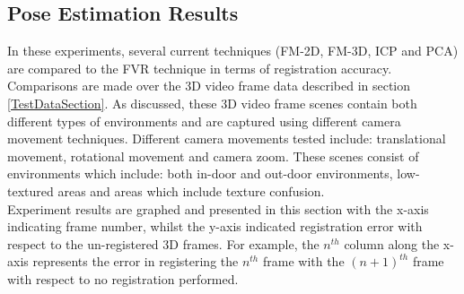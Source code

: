 \subsection{Pose Estimation Results}

In these experiments, several current techniques (FM-2D, FM-3D, ICP and PCA) are compared to the FVR technique in terms of registration accuracy. Comparisons are made over  the 3D video frame data described in section \ref{TestDataSection}. As discussed, these 3D video frame scenes contain both different types of environments and are captured using different camera movement techniques. Different camera movements tested include: translational movement, rotational movement and camera zoom. These scenes consist of environments which include: both in-door and out-door environments, low-textured areas and areas which include texture confusion. \\

Experiment results are graphed and presented in this section with the x-axis indicating frame number, whilst the y-axis indicated registration error with respect to the un-registered 3D frames. For example, the $n^{th}$ column along the x-axis represents the error in registering the $n^{th}$ frame with the $(n+1)^{th}$ frame with respect to no registration performed. \\ 







